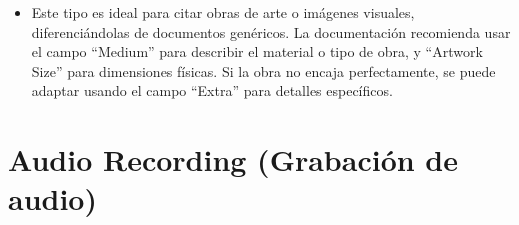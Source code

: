 \documentclass[
  jou,
  floatsintext,
  longtable,
  a4paper,
  nolmodern,
  notxfonts,
  notimes,
  12pt,
  colorlinks=true,linkcolor=blue,citecolor=blue,urlcolor=blue]{apa7}
\providecommand{\tightlist}{%
  \setlength{\itemsep}{0pt}\setlength{\parskip}{0pt}}
\begin{document}
\begin{itemize}
  \begin{itemize}
  \tightlist
  \item
    Este tipo es ideal para citar obras de arte o imágenes visuales,
    diferenciándolas de documentos genéricos. La documentación
    recomienda usar el campo ``Medium'' para describir el material o
    tipo de obra, y ``Artwork Size'' para dimensiones físicas. Si la
    obra no encaja perfectamente, se puede adaptar usando el campo
    ``Extra'' para detalles específicos.
  \end{itemize}
\end{itemize}

\section{Audio Recording (Grabación de
audio)}\label{audio-recording-grabaciuxf3n-de-audio}
\end{document}
